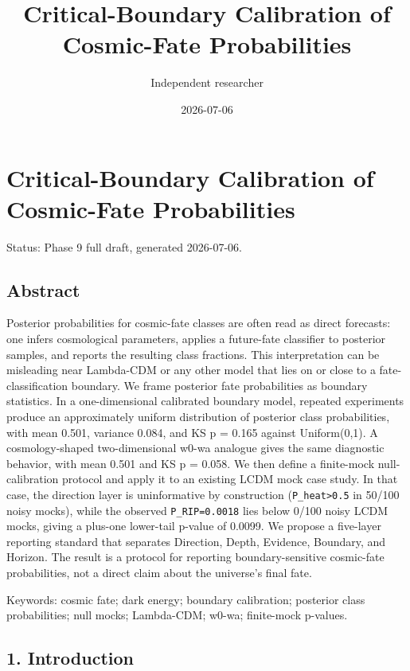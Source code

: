 \documentclass[
]{article}
\title{Critical-Boundary Calibration of Cosmic-Fate Probabilities}
\author{Independent researcher}
\date{2026-07-06}
\begin{document}
\maketitle

\section{Critical-Boundary Calibration of Cosmic-Fate
Probabilities}\label{critical-boundary-calibration-of-cosmic-fate-probabilities}

Status: Phase 9 full draft, generated 2026-07-06.

\subsection{Abstract}\label{abstract}

Posterior probabilities for cosmic-fate classes are often read as direct
forecasts: one infers cosmological parameters, applies a future-fate
classifier to posterior samples, and reports the resulting class
fractions. This interpretation can be misleading near Lambda-CDM or any
other model that lies on or close to a fate-classification boundary. We
frame posterior fate probabilities as boundary statistics. In a
one-dimensional calibrated boundary model, repeated experiments produce
an approximately uniform distribution of posterior class probabilities,
with mean 0.501, variance 0.084, and KS p = 0.165 against Uniform(0,1).
A cosmology-shaped two-dimensional w0-wa analogue gives the same
diagnostic behavior, with mean 0.501 and KS p = 0.058. We then define a
finite-mock null-calibration protocol and apply it to an existing LCDM
mock case study. In that case, the direction layer is uninformative by
construction (\texttt{P\_heat\textgreater{}0.5} in 50/100 noisy mocks),
while the observed \texttt{P\_RIP=0.0018} lies below 0/100 noisy LCDM
mocks, giving a plus-one lower-tail p-value of 0.0099. We propose a
five-layer reporting standard that separates Direction, Depth, Evidence,
Boundary, and Horizon. The result is a protocol for reporting
boundary-sensitive cosmic-fate probabilities, not a direct claim about
the universe's final fate.

Keywords: cosmic fate; dark energy; boundary calibration; posterior
class probabilities; null mocks; Lambda-CDM; w0-wa; finite-mock
p-values.

\subsection{1. Introduction}\label{introduction}
\end{document}
